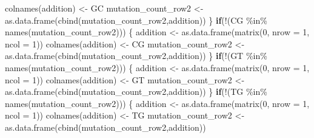 \documentclass[
]{article}
\newenvironment{Shaded}{\begin{snugshade}}{\end{snugshade}}
\newcommand{\AttributeTok}[1]{\textcolor[rgb]{0.77,0.63,0.00}{#1}}
\newcommand{\ControlFlowTok}[1]{\textcolor[rgb]{0.13,0.29,0.53}{\textbf{#1}}}
\newcommand{\DecValTok}[1]{\textcolor[rgb]{0.00,0.00,0.81}{#1}}
\newcommand{\FunctionTok}[1]{\textcolor[rgb]{0.00,0.00,0.00}{#1}}
\newcommand{\NormalTok}[1]{#1}
\newcommand{\OtherTok}[1]{\textcolor[rgb]{0.56,0.35,0.01}{#1}}
\newcommand{\SpecialCharTok}[1]{\textcolor[rgb]{0.00,0.00,0.00}{#1}}
\newcommand{\StringTok}[1]{\textcolor[rgb]{0.31,0.60,0.02}{#1}}
\begin{document}
\begin{Shaded}
\begin{Highlighting}[]
    \FunctionTok{colnames}\NormalTok{(addition) }\OtherTok{\textless{}{-}} \StringTok{\textquotesingle{}GC\textquotesingle{}}
\NormalTok{    mutation\_count\_row2 }\OtherTok{\textless{}{-}} \FunctionTok{as.data.frame}\NormalTok{(}\FunctionTok{cbind}\NormalTok{(mutation\_count\_row2,addition))}
\NormalTok{  \}}
  \ControlFlowTok{if}\NormalTok{(}\SpecialCharTok{!}\NormalTok{(}\StringTok{\textquotesingle{}CG\textquotesingle{}} \SpecialCharTok{\%in\%} \FunctionTok{names}\NormalTok{(mutation\_count\_row2)))}
\NormalTok{  \{}
\NormalTok{    addition }\OtherTok{\textless{}{-}} \FunctionTok{as.data.frame}\NormalTok{(}\FunctionTok{matrix}\NormalTok{(}\DecValTok{0}\NormalTok{, }\AttributeTok{nrow =} \DecValTok{1}\NormalTok{, }\AttributeTok{ncol =} \DecValTok{1}\NormalTok{))}
    \FunctionTok{colnames}\NormalTok{(addition) }\OtherTok{\textless{}{-}} \StringTok{\textquotesingle{}CG\textquotesingle{}}
\NormalTok{    mutation\_count\_row2 }\OtherTok{\textless{}{-}} \FunctionTok{as.data.frame}\NormalTok{(}\FunctionTok{cbind}\NormalTok{(mutation\_count\_row2,addition))}
\NormalTok{  \}}
  \ControlFlowTok{if}\NormalTok{(}\SpecialCharTok{!}\NormalTok{(}\StringTok{\textquotesingle{}GT\textquotesingle{}} \SpecialCharTok{\%in\%} \FunctionTok{names}\NormalTok{(mutation\_count\_row2)))}
\NormalTok{  \{}
\NormalTok{    addition }\OtherTok{\textless{}{-}} \FunctionTok{as.data.frame}\NormalTok{(}\FunctionTok{matrix}\NormalTok{(}\DecValTok{0}\NormalTok{, }\AttributeTok{nrow =} \DecValTok{1}\NormalTok{, }\AttributeTok{ncol =} \DecValTok{1}\NormalTok{))}
    \FunctionTok{colnames}\NormalTok{(addition) }\OtherTok{\textless{}{-}} \StringTok{\textquotesingle{}GT\textquotesingle{}}
\NormalTok{    mutation\_count\_row2 }\OtherTok{\textless{}{-}} \FunctionTok{as.data.frame}\NormalTok{(}\FunctionTok{cbind}\NormalTok{(mutation\_count\_row2,addition))}
\NormalTok{  \}}
  \ControlFlowTok{if}\NormalTok{(}\SpecialCharTok{!}\NormalTok{(}\StringTok{\textquotesingle{}TG\textquotesingle{}} \SpecialCharTok{\%in\%} \FunctionTok{names}\NormalTok{(mutation\_count\_row2)))}
\NormalTok{  \{}
\NormalTok{    addition }\OtherTok{\textless{}{-}} \FunctionTok{as.data.frame}\NormalTok{(}\FunctionTok{matrix}\NormalTok{(}\DecValTok{0}\NormalTok{, }\AttributeTok{nrow =} \DecValTok{1}\NormalTok{, }\AttributeTok{ncol =} \DecValTok{1}\NormalTok{))}
    \FunctionTok{colnames}\NormalTok{(addition) }\OtherTok{\textless{}{-}} \StringTok{\textquotesingle{}TG\textquotesingle{}}
\NormalTok{    mutation\_count\_row2 }\OtherTok{\textless{}{-}} \FunctionTok{as.data.frame}\NormalTok{(}\FunctionTok{cbind}\NormalTok{(mutation\_count\_row2,addition))}

\end{Highlighting}
\end{Shaded}
\end{document}
